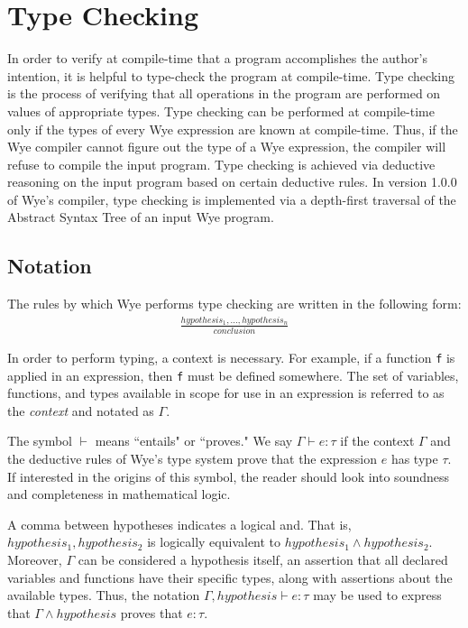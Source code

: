 \documentclass[a4paper, 12pt]{article}
\newcommand{\version}{1.0.0}
\begin{document}
\section{Type Checking}

In order to verify at compile-time that a program accomplishes the author's intention, it is helpful to type-check the program at compile-time. Type checking is the process of verifying that all operations in the program are performed on values of appropriate types. Type checking can be performed at compile-time only if the types of every Wye expression are known at compile-time. Thus, if the Wye compiler cannot figure out the type of a Wye expression, the compiler will refuse to compile the input program. Type checking is achieved via deductive reasoning on the input program based on certain deductive rules. In version \version{} of Wye's compiler, type checking is implemented via a depth-first traversal of the Abstract Syntax Tree of an input Wye program.

\subsection{Notation}

The rules by which Wye performs type checking are written in the following form:
\begin{align*}
\frac{hypothesis_1, ..., hypothesis_n}{conclusion}
\end{align*}

In order to perform typing, a context is necessary. For example, if a function \texttt{f} is applied in an expression, then \texttt{f} must be defined somewhere. The set of variables, functions, and types available in scope for use in an expression is referred to as the \textit{context} and notated as $\Gamma$.

The symbol $\vdash$ means ``entails" or ``proves." We say $\Gamma\vdash e: \tau$ if the context $\Gamma$ and the deductive rules of Wye's type system prove that the expression $e$ has type $\tau$. If interested in the origins of this symbol, the reader should look into soundness and completeness in mathematical logic.

A comma between hypotheses indicates a logical and. That is, $hypothesis_1, hypothesis_2$ is logically equivalent to $hypothesis_1 \wedge hypothesis_2$. Moreover, $\Gamma$ can be considered a hypothesis itself, an assertion that all declared variables and functions have their specific types, along with assertions about the available types. Thus, the notation $\Gamma, hypothesis \vdash e: \tau$ may be used to express that $\Gamma \wedge hypothesis$ proves that $e: \tau$.
\end{document}
